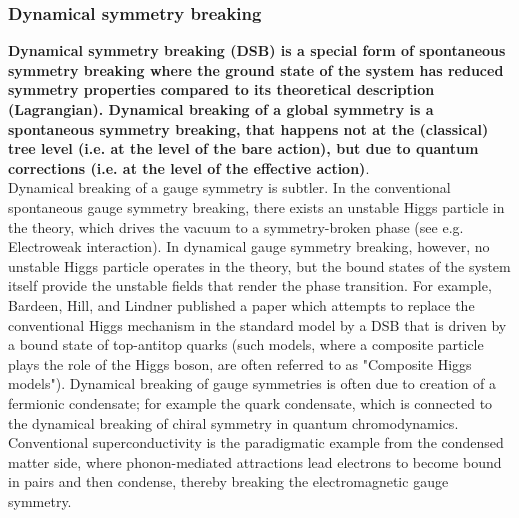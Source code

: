 \subsubsection{Dynamical symmetry breaking}
\textbf{Dynamical symmetry breaking (DSB) is a special form of spontaneous symmetry breaking where the ground state of the system has reduced symmetry properties compared to its theoretical description (Lagrangian). Dynamical breaking of a global symmetry is a spontaneous symmetry breaking, that happens not at the (classical) tree level (i.e. at the level of the bare action), but due to quantum corrections (i.e. at the level of the effective action)}.\\
Dynamical breaking of a gauge symmetry is subtler. In the conventional spontaneous gauge symmetry breaking, there exists an unstable Higgs particle in the theory, which drives the vacuum to a symmetry-broken phase (see e.g. Electroweak interaction). In dynamical gauge symmetry breaking, however, no unstable Higgs particle operates in the theory, but the bound states of the system itself provide the unstable fields that render the phase transition. For example, Bardeen, Hill, and Lindner published a paper which attempts to replace the conventional Higgs mechanism in the standard model by a DSB that is driven by a bound state of top-antitop quarks (such models, where a composite particle plays the role of the Higgs boson, are often referred to as "Composite Higgs models"). Dynamical breaking of gauge symmetries is often due to creation of a fermionic condensate; for example the quark condensate, which is connected to the dynamical breaking of chiral symmetry in quantum chromodynamics. Conventional superconductivity is the paradigmatic example from the condensed matter side, where phonon-mediated attractions lead electrons to become bound in pairs and then condense, thereby breaking the electromagnetic gauge symmetry.
